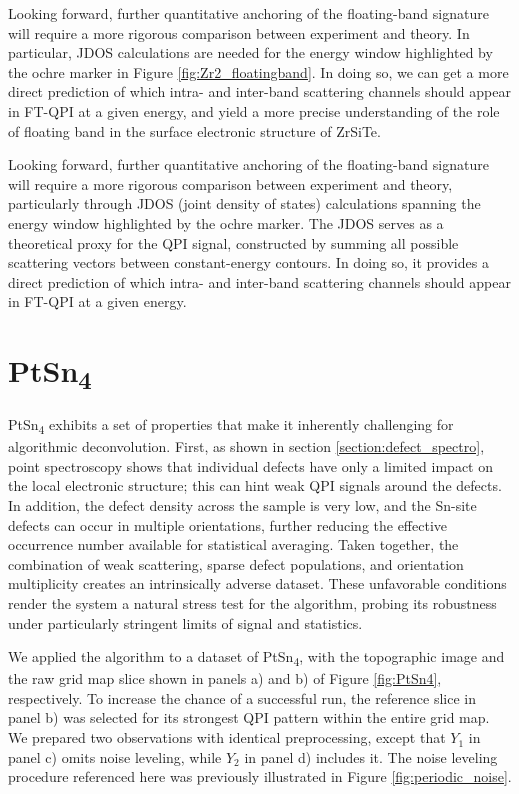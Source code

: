 Looking forward, further quantitative anchoring of the floating-band signature will require a more rigorous comparison between experiment and theory. In particular, \ac{JDOS} calculations are needed for the energy window highlighted by the ochre marker in Figure \ref{fig:Zr2_floatingband}. In doing so, we can get a more direct prediction of which intra- and inter-band scattering channels should appear in FT-QPI at a given energy, and yield a more precise understanding of the role of floating band in the surface electronic structure of ZrSiTe. 

Looking forward, further quantitative anchoring of the floating-band signature will require a more rigorous comparison between experiment and theory, particularly through JDOS (joint density of states) calculations spanning the energy window highlighted by the ochre marker. The JDOS serves as a theoretical proxy for the QPI signal, constructed by summing all possible scattering vectors between constant-energy contours. In doing so, it provides a direct prediction of which intra- and inter-band scattering channels should appear in FT-QPI at a given energy.

\section{PtSn\textsubscript{4}}

PtSn\textsubscript{4} exhibits a set of properties that make it inherently challenging for algorithmic deconvolution. First, as shown in section \ref{section:defect_spectro}, point spectroscopy shows that individual defects have only a limited impact on the local electronic structure; this can hint weak \ac{QPI} signals around the defects. In addition, the defect density across the sample is very low, and the Sn-site defects can occur in multiple orientations, further reducing the effective occurrence number available for statistical averaging. Taken together, the combination of weak scattering, sparse defect populations, and orientation multiplicity creates an intrinsically adverse dataset. These unfavorable conditions render the system a natural stress test for the algorithm, probing its robustness under particularly stringent limits of signal and statistics.

We applied the algorithm to a dataset of PtSn\textsubscript{4}, with the topographic image and the raw grid map slice shown in panels a) and b) of Figure \ref{fig:PtSn4}, respectively. To increase the chance of a successful run, the reference slice in panel b) was selected for its strongest QPI pattern within the entire grid map. We prepared two observations with identical preprocessing, except that $Y_1$ in panel c) omits noise leveling, while $Y_2$ in panel d) includes it. The noise leveling procedure referenced here was previously illustrated in Figure \ref{fig:periodic_noise}.

